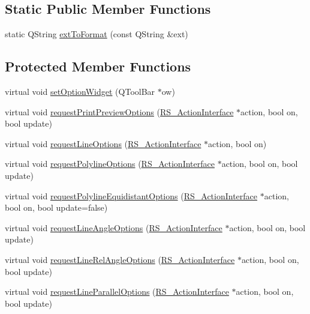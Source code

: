\subsection*{Static Public Member Functions}
\begin{DoxyCompactItemize}
\item 
static Q\-String \hyperlink{classQG__DialogFactory_a85ac1b84781c6fbfc0ac37a82c73da32}{ext\-To\-Format} (const Q\-String \&ext)
\end{DoxyCompactItemize}
\subsection*{Protected Member Functions}
\begin{DoxyCompactItemize}
\item 
virtual void \hyperlink{classQG__DialogFactory_a3c0d330d9f30231cddc5f193d8368672}{set\-Option\-Widget} (Q\-Tool\-Bar $\ast$ow)
\item 
virtual void \hyperlink{classQG__DialogFactory_a8b2cab8df61e3c1cc4e96ecae0753bd9}{request\-Print\-Preview\-Options} (\hyperlink{classRS__ActionInterface}{R\-S\-\_\-\-Action\-Interface} $\ast$action, bool on, bool update)
\item 
virtual void \hyperlink{classQG__DialogFactory_a0cc6ddb15ec42740f3f38e41770df284}{request\-Line\-Options} (\hyperlink{classRS__ActionInterface}{R\-S\-\_\-\-Action\-Interface} $\ast$action, bool on)
\item 
virtual void \hyperlink{classQG__DialogFactory_a5bbf45df7a6eb0032b9a7960cd09f1e9}{request\-Polyline\-Options} (\hyperlink{classRS__ActionInterface}{R\-S\-\_\-\-Action\-Interface} $\ast$action, bool on, bool update)
\item 
virtual void \hyperlink{classQG__DialogFactory_ac714ac286131d71810b706abe4d8b261}{request\-Polyline\-Equidistant\-Options} (\hyperlink{classRS__ActionInterface}{R\-S\-\_\-\-Action\-Interface} $\ast$action, bool on, bool update=false)
\item 
virtual void \hyperlink{classQG__DialogFactory_a2b3108d43ca7db6b3901a30ab8c89d61}{request\-Line\-Angle\-Options} (\hyperlink{classRS__ActionInterface}{R\-S\-\_\-\-Action\-Interface} $\ast$action, bool on, bool update)
\item 
virtual void \hyperlink{classQG__DialogFactory_a9bc8c8fc5e565acd9302639a7694976e}{request\-Line\-Rel\-Angle\-Options} (\hyperlink{classRS__ActionInterface}{R\-S\-\_\-\-Action\-Interface} $\ast$action, bool on, bool update)
\item 
virtual void \hyperlink{classQG__DialogFactory_a76d0a18b0ce569ba69794aef0482c991}{request\-Line\-Parallel\-Options} (\hyperlink{classRS__ActionInterface}{R\-S\-\_\-\-Action\-Interface} $\ast$action, bool on, bool update)

\end{DoxyCompactItemize}
